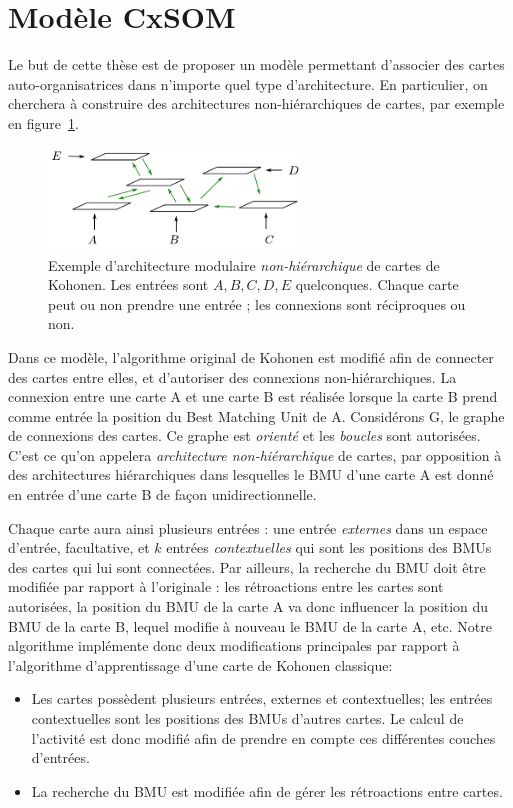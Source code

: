\section{Modèle CxSOM}

Le but de cette thèse est de proposer un modèle permettant d'associer des cartes auto-organisatrices dans n'importe quel type d'architecture. En particulier, on cherchera à construire des architectures non-hiérarchiques de cartes, par exemple en figure~\ref{fig:archi_non_hierarchique}.

\begin{figure}
\centering
\includegraphics[width=0.6\textwidth]{architecture.pdf}
\caption{Exemple d'architecture modulaire \emph{non-hiérarchique} de cartes de Kohonen. Les entrées sont $A,B,C,D,E$ quelconques. Chaque carte peut ou non prendre une entrée ; les connexions sont réciproques ou non.}
\label{fig:archi_non_hierarchique}
\end{figure}

Dans ce modèle, l'algorithme original de Kohonen est modifié afin de connecter des cartes entre elles, et d'autoriser des connexions non-hiérarchiques.
La connexion entre une carte A et une carte B est réalisée lorsque la carte B prend comme entrée la position du Best Matching Unit de A. 
Considérons G, le graphe de connexions des cartes. Ce graphe est \emph{orienté} et les \emph{boucles} sont autorisées. C'est ce qu'on appelera \emph{architecture non-hiérarchique} de cartes, par opposition à des architectures hiérarchiques dans lesquelles le BMU d'une carte A est donné en entrée d'une carte B de façon unidirectionnelle. 

Chaque carte aura ainsi plusieurs entrées : une entrée \emph{externes} dans un espace d'entrée, facultative, et $k$ entrées \emph{contextuelles} qui sont les positions des BMUs des cartes qui lui sont connectées. Par ailleurs, la recherche du BMU doit être modifiée par rapport à l'originale : les rétroactions entre les cartes sont autorisées, la position du BMU de la carte A va donc influencer la position du BMU de la carte B, lequel modifie à nouveau le BMU de la carte A, etc. 
Notre algorithme implémente donc deux modifications principales par rapport à l'algorithme d'apprentissage d'une carte de Kohonen classique: 
\begin{itemize}
\item Les cartes possèdent plusieurs entrées, externes et contextuelles; les entrées contextuelles sont les positions des BMUs d'autres cartes. Le calcul de l'activité est donc modifié afin de prendre en compte ces différentes couches d'entrées.
\item La recherche du BMU est modifiée afin de gérer les rétroactions entre cartes.
\end{itemize}

